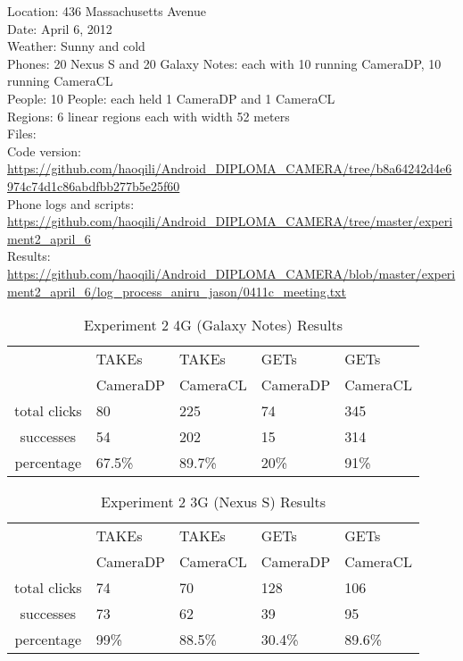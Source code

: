 Location: 436 Massachusetts Avenue\\
Date: April 6, 2012\\
Weather: Sunny and cold\\
Phones: 20 Nexus S and 20 Galaxy Notes: each with 10 running CameraDP, 10 running CameraCL\\
People: 10 People: each held 1 CameraDP and 1 CameraCL\\
Regions: 6 linear regions each with width 52 meters\\
Files:\\
Code version: {\url{https://github.com/haoqili/Android_DIPLOMA_CAMERA/tree/b8a64242d4e6974c74d1c86abdfbb277b5e25f60}}\\
Phone logs and scripts: {\url{https://github.com/haoqili/Android_DIPLOMA_CAMERA/tree/master/experiment2_april_6}}\\ 
Results: {\url{https://github.com/haoqili/Android_DIPLOMA_CAMERA/blob/master/experiment2_april_6/log_process_aniru_jason/0411c_meeting.txt}}\\

\begin{table}[htb]
\begin{scriptsize} 
\caption{Experiment 2 4G (Galaxy Notes) Results} 
\label{table:exp-2-4g-results}
 \begin{center}
 \begin{tabular}{| c | p{1.5cm} | p{1.5cm} | p{1.5cm} | p{1.4cm} |}
  \hline
  & TAKEs & TAKEs & GETs & GETs \\
  & CameraDP & CameraCL & CameraDP & CameraCL \\
  \hline
  total clicks & 80 & 225 & 74 & 345 \\
  \hline
  successes & 54 & 202 & 15 & 314 \\
  \hline
  percentage & 67.5\% & 89.7\% & 20\% & 91\% \\
  \hline
  \end{tabular}
  \end{center}
\end{scriptsize}
\end{table}

\begin{table}[htb]
\begin{scriptsize} 
\caption{Experiment 2 3G (Nexus S) Results} 
\label{table:exp-2-3g-results}
 \begin{center}
 \begin{tabular}{| c | p{1.5cm} | p{1.5cm} | p{1.5cm} | p{1.4cm} |}
  \hline
  & TAKEs & TAKEs & GETs & GETs \\
  & CameraDP & CameraCL & CameraDP & CameraCL \\
  \hline
  total clicks & 74 & 70 & 128 & 106 \\
  \hline
  successes & 73 & 62 & 39 & 95 \\
  \hline
  percentage & 99\% & 88.5\% & 30.4\% & 89.6\% \\
  \hline
  \end{tabular}
  \end{center}
\end{scriptsize}
\end{table}

